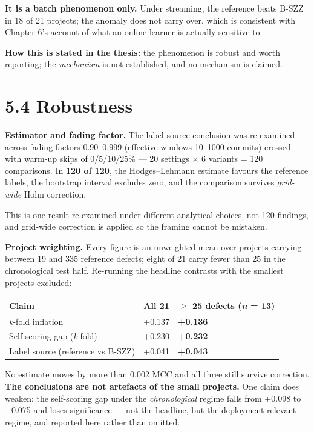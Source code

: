 \textbf{It is a batch phenomenon only.} Under streaming, the reference
beats B-SZZ in 18 of 21 projects; the anomaly does not carry over, which
is consistent with Chapter 6's account of what an online learner is
actually sensitive to.

\textbf{How this is stated in the thesis:} the phenomenon is robust and
worth reporting; the \emph{mechanism} is not established, and no
mechanism is claimed.

\section{5.4 Robustness}\label{robustness}

\textbf{Estimator and fading factor.} The label-source conclusion was
re-examined across fading factors 0.90--0.999 (effective windows
10--1000 commits) crossed with warm-up skips of 0/5/10/25\% --- 20
settings \ensuremath{\times} 6 variants = 120 comparisons. In \textbf{120 of 120}, the
Hodges--Lehmann estimate favours the reference labels, the bootstrap
interval excludes zero, and the comparison survives \emph{grid-wide}
Holm correction.

This is one result re-examined under different analytical choices, not
120 findings, and grid-wide correction is applied so the framing cannot
be mistaken.

\textbf{Project weighting.} Every figure is an unweighted mean over
projects carrying between 19 and 335 reference defects; eight of 21
carry fewer than 25 in the chronological test half. Re-running the
headline contrasts with the smallest projects excluded:

\begin{longtable}[]{@{}lll@{}}
\toprule\noalign{}
Claim & All 21 & \ensuremath{\geq} 25 defects (\emph{n} = 13) \\
\midrule\noalign{}
\endhead
\bottomrule\noalign{}
\endlastfoot
\emph{k}-fold inflation & +0.137 & \textbf{+0.136} \\
Self-scoring gap (\emph{k}-fold) & +0.230 & \textbf{+0.232} \\
Label source (reference vs B-SZZ) & +0.041 & \textbf{+0.043} \\
\end{longtable}

No estimate moves by more than 0.002 MCC and all three still survive
correction. \textbf{The conclusions are not artefacts of the small
projects.} One claim does weaken: the self-scoring gap under the
\emph{chronological} regime falls from +0.098 to +0.075 and loses
significance --- not the headline, but the deployment-relevant regime,
and reported here rather than omitted.


